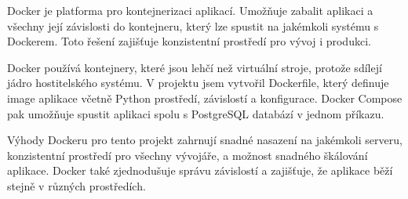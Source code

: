 \documentclass[a4paper,12pt]{article}
\begin{document}
Docker je platforma pro kontejnerizaci aplikací. Umožňuje zabalit aplikaci a všechny její závislosti do kontejneru, který lze spustit na jakémkoli systému s Dockerem. Toto řešení zajišťuje konzistentní prostředí pro vývoj i produkci.

Docker používá kontejnery, které jsou lehčí než virtuální stroje, protože sdílejí jádro hostitelského systému. V projektu jsem vytvořil Dockerfile, který definuje image aplikace včetně Python prostředí, závislostí a konfigurace. Docker Compose pak umožňuje spustit aplikaci spolu s PostgreSQL databází v jednom příkazu.

Výhody Dockeru pro tento projekt zahrnují snadné nasazení na jakémkoli serveru, konzistentní prostředí pro všechny vývojáře, a možnost snadného škálování aplikace. Docker také zjednodušuje správu závislostí a zajišťuje, že aplikace běží stejně v různých prostředích.
\end{document}
